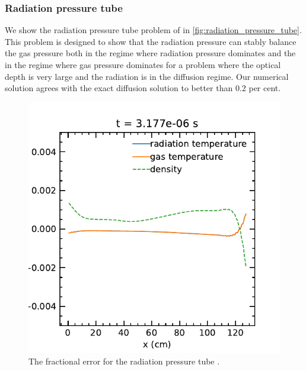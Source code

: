 \documentclass[fleqn,usenatbib]{mnras}
\begin{document}
\subsubsection{Radiation pressure tube}
We show the radiation pressure tube problem of \cite{Krumholz_2007} in \autoref{fig:radiation_pressure_tube}. This problem is designed to show that the radiation pressure can stably balance the gas pressure both in the regime where radiation pressure dominates and the in the regime where gas pressure dominates for a problem where the optical depth is very large and the radiation is in the diffusion regime. Our numerical solution agrees with the exact diffusion solution to better than $0.2$ per cent. 
\begin{figure}
    \includegraphics[width=\columnwidth]{radiation_pressure_tube.pdf}
    \caption{The fractional error for the radiation pressure tube \citep{Krumholz_2007}.}
    \label{fig:radiation_pressure_tube}
\end{figure}
\end{document}
